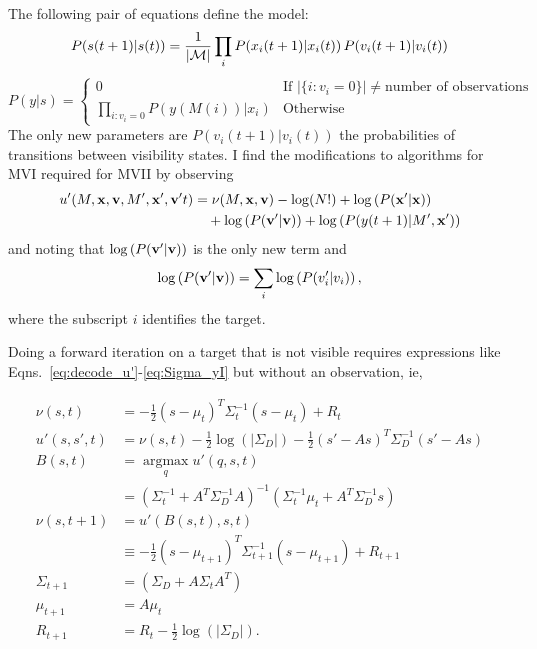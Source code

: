 \documentclass[12pt]{article}
\newcommand{\M}{{\cal M}}
\newcommand{\ti}[2]{{#1}{(#2)}}                         %
\newcommand{\argmax}{\operatorname*{argmax}}
\begin{document}
The following pair of equations define the model:
\begin{equation}
  P(\ti{s}{t+1}|\ti{s}{t}) = \frac{1}{\left| \M \right|} \prod_i
  P(\ti{x_i}{t+1}|\ti{x_i}{t})\, P(\ti{v_i}{t+1}|\ti{v_i}{t})
\end{equation}
\begin{equation}
  P(y|s) =
  \begin{cases}
    0 & \text{If } \left| \{i:v_i=0 \} \right| \neq \text{number of
      observations} \\
    \prod_{i:v_i=0} P(y(M(i))|x_i) & \text{Otherwise}
  \end{cases}
\end{equation}
The only new parameters are $P(\ti{v_i}{t+1}|\ti{v_i}{t})$ the
probabilities of transitions between visibility states.  I find the
modifications to algorithms for MVI required for MVII by observing
\begin{align}
  u'(M,\bx,\bv,M',\bx',\bv't) &= \nu(M,\bx,\bv) - \log(N!) + \log \left(
    P(\bx'|\bx)\right) \nonumber \\
  & \quad + \log \left( P(\bv'|\bv)\right) + \log \left(
  P(\ti{y}{t+1}|M',\bx')\right)
\end{align}
and noting that $\log \left( P({\mathbf{v}}'|{\mathbf{v}})\right)$ is the only new term
and
\begin{equation}
  \label{eq:1}
   \log \left( P({\mathbf{v}}'|{\mathbf{v}})\right) = \sum_i \log \left(
     P(v_i'|v_i)\right),
\end{equation}
where the subscript $i$ identifies the target.

Doing a forward iteration on a target that is not visible requires
expressions like Eqns.~\eqref{eq:decode_u'}-\eqref{eq:Sigma_yI} but
without an observation, ie,


\begin{align}
  \nu(s,t) &= -\frac{1}{2}(s-\mu_{t})^T
    \Sigma_{t}^{-1}(s-\mu_{t}) + R_t \nonumber \\
  u'(s,s',t) &= \nu(s,t) -\frac{1}{2} \log(\left|\Sigma_D\right|)  - 
  \frac{1}{2}(s'-As)^T \Sigma_{D}^{-1} (s'-As)  \nonumber \\
  B(s,t) &= \argmax_{q} u'(q,s,t) \nonumber \\
  &= \left( \Sigma_t^{-1} + A^T \Sigma_D^{-1} A \right)^{-1} \left(
    \Sigma_t^{-1} \mu_t + A^T \Sigma_D^{-1} s \right) \nonumber \\
  \nu(s,t+1) &= u'(B(s,t),s,t) \nonumber \\
  &\equiv  -\frac{1}{2}(s-\mu_{t+1})^T
  \Sigma_{t+1}^{-1}(s-\mu_{t+1}) + R_{t+1} \nonumber \\
  \label{eq:new_Sigma_noy}
  \Sigma_{t+1} & = \left( \Sigma_D + A \Sigma_tA^T \right) \\
  \label{eq:new_mu_noy}
  \mu_{t+1} &= A \mu_t \\
  \label{eq:new_R_noy}
  R_{t+1} &= R_t -\frac{1}{2}  \log(\left|\Sigma_D\right|).
\end{align}
\end{document}
